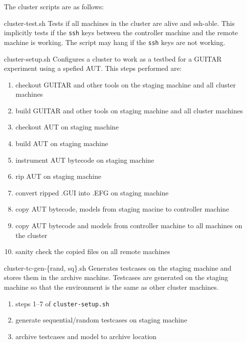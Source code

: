 The cluster scripts are as follows:\\

\begin{smalldescription}
   \item [cluster-test.sh] Tests if all machines in the cluster are alive and ssh-able. This implicitly tests if the \texttt{ssh} keys between the controller machine and the remote machine is working. The script may hang if the \texttt{ssh} keys are not working.

   \item [cluster-setup.sh] Configures a cluster to work as a testbed for a GUITAR experiment using a spefied AUT. This steps performed are:
   \begin{enumerate}
      \item checkout GUITAR and other tools on the staging machine and all cluster machines
      \item build GUITAR and other tools on staging machine and all cluster machines
      \item checkout AUT on staging machine
      \item build AUT on staging machine
      \item instrument AUT bytecode on staging machine
      \item rip AUT on staging machine
      \item convert ripped .GUI into .EFG on staging machine
      \item copy AUT bytecode, models from staging macine to controller machine
      \item copy AUT bytecode and models from controller machine to all machines on the cluster
      \item sanity check the copied files on all remote machines
   \end{enumerate}

   \item [cluster-tc-gen-\{rand, sq\}.sh] Generates testcases on the staging machine and stores them in the archive machine. Testcases are generated on the staging machine so that the environment is the same as other cluster machines.
   \begin{enumerate}
      \item steps 1--7 of \texttt{cluster-setup.sh}
      \item generate sequential/random testcases on staging machine
      \item archive testcases and model to archive location
   \end{enumerate}


\end{smalldescription}
